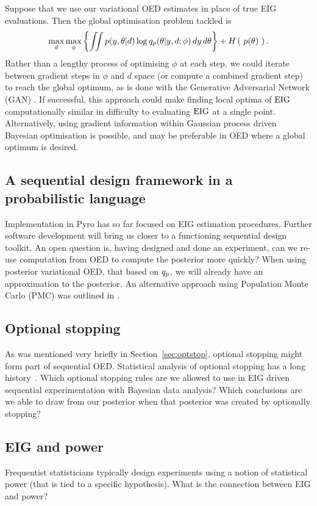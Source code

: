Suppose that we use our variational OED estimates in place of true EIG evaluations. Then the global optimisation problem tackled is
\begin{equation}
	\max_d \max_\phi \left\{ \iint p(y, \theta | d) \log q_p (\theta | y, d; \phi)\, dy\, d\theta  \right\} + H\left(\ p(\theta)\ \right).
\end{equation}
Rather than a lengthy process of optimising $\phi$ at each step, we could iterate between gradient steps in $\phi$ and $d$ space (or compute a combined gradient step) to reach the global optimum, as is done with the Generative Adversarial Network (GAN) \cite{goodfellow2014generative}. If successful, this approach could make finding local optima of $\text{EIG}$ computationally similar in difficulty to evaluating $\text{EIG}$ at a single point.
Alternatively, using gradient information within Gaussian process driven Bayesian optimisation \cite{osborne2009gaussian} is possible, and may be preferable in OED where a global optimum is desired.

\subsection{A sequential design framework in a probabilistic language}
Implementation in Pyro has so far focused on EIG estimation procedures. Further software development will bring us closer to a functioning sequential design toolkit. An open question is, having designed and done an experiment, can we  re-use computation from OED to compute the posterior more quickly? When using posterior variational OED, that based on $q_p$, we will already have an approximation to the posterior. An alternative approach using Population Monte Carlo (PMC) was outlined in \cite{vincent2017}.


\subsection{Optional stopping}
As was mentioned very briefly in Section~\ref{sec:optstop}, optional stopping might form part of sequential OED. Statistical analysis of optional stopping has a long history~\cite{chernoff1972sequential}. Which optional stopping rules are we allowed to use in EIG driven sequential experimentation with Bayesian data analysis?  Which conclusions are we able to draw from our posterior when that posterior was created by optionally stopping?


\subsection{EIG and power}
Frequentist statisticians typically design experiments using a notion of statistical power (that is tied to a specific hypothesis). What is the connection between EIG and power?

